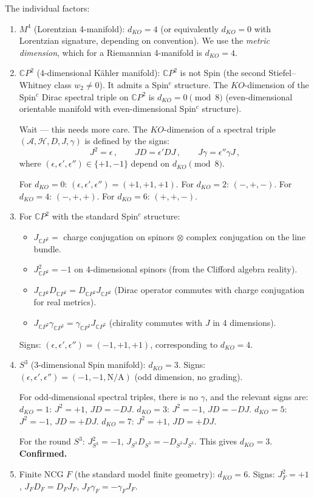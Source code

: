 \documentclass[11pt,a4paper]{article}
\newcommand{\CP}{\mathbb{C}P}
\begin{document}
The individual factors:
\begin{enumerate}
\item $M^4$ (Lorentzian 4-manifold): $d_{KO} = 4$ (or equivalently $d_{KO} = 0$ with Lorentzian signature, depending on convention). We use the \emph{metric dimension}, which for a Riemannian 4-manifold is $d_{KO} = 4$.

\item $\CP^2$ (4-dimensional K\"ahler manifold): $\CP^2$ is not Spin (the second Stiefel--Whitney class $w_2 \neq 0$). It admits a Spin$^c$ structure. The $KO$-dimension of the Spin$^c$ Dirac spectral triple on $\CP^2$ is $d_{KO} = 0 \pmod{8}$ (even-dimensional orientable manifold with even-dimensional Spin$^c$ structure).

Wait --- this needs more care. The $KO$-dimension of a spectral triple $(\mathcal{A}, \mathcal{H}, D, J, \gamma)$ is defined by the signs:
\begin{equation}
J^2 = \epsilon\,,\qquad JD = \epsilon'DJ\,,\qquad J\gamma = \epsilon''\gamma J\,,
\end{equation}
where $(\epsilon, \epsilon', \epsilon'') \in \{+1, -1\}$ depend on $d_{KO} \pmod{8}$.

For $d_{KO} = 0$: $(\epsilon, \epsilon', \epsilon'') = (+1, +1, +1)$.
For $d_{KO} = 2$: $(-, +, -)$.
For $d_{KO} = 4$: $(-, +, +)$.
For $d_{KO} = 6$: $(+, +, -)$.

\item For $\CP^2$ with the standard Spin$^c$ structure:
\begin{itemize}
\item $J_{\CP^2} = $ charge conjugation on spinors $\otimes$ complex conjugation on the line bundle.
\item $J_{\CP^2}^2 = -1$ on 4-dimensional spinors (from the Clifford algebra reality).
\item $J_{\CP^2}D_{\CP^2} = D_{\CP^2}J_{\CP^2}$ (Dirac operator commutes with charge conjugation for real metrics).
\item $J_{\CP^2}\gamma_{\CP^2} = \gamma_{\CP^2}J_{\CP^2}$ (chirality commutes with $J$ in 4 dimensions).
\end{itemize}
Signs: $(\epsilon, \epsilon', \epsilon'') = (-1, +1, +1)$, corresponding to $d_{KO} = 4$.

\item $S^3$ (3-dimensional Spin manifold): $d_{KO} = 3$.
Signs: $(\epsilon, \epsilon', \epsilon'') = (-1, -1, \text{N/A})$ (odd dimension, no grading).

For odd-dimensional spectral triples, there is no $\gamma$, and the relevant signs are:
$d_{KO} = 1$: $J^2 = +1$, $JD = -DJ$.
$d_{KO} = 3$: $J^2 = -1$, $JD = -DJ$.
$d_{KO} = 5$: $J^2 = -1$, $JD = +DJ$.
$d_{KO} = 7$: $J^2 = +1$, $JD = +DJ$.

For the round $S^3$: $J_{S^3}^2 = -1$, $J_{S^3}D_{S^3} = -D_{S^3}J_{S^3}$. This gives $d_{KO} = 3$. \textbf{Confirmed.}

\item Finite NCG $F$ (the standard model finite geometry): $d_{KO} = 6$.
Signs: $J_F^2 = +1$, $J_FD_F = D_FJ_F$, $J_F\gamma_F = -\gamma_FJ_F$.
\end{enumerate}
\end{document}
